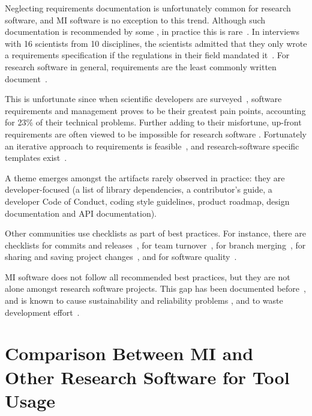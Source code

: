 \documentclass[draft, 12pt, 3p, times]{elsarticle} %
\begin{document}
Neglecting requirements documentation is unfortunately common for research
software, and MI software is no exception to this trend.  Although such
documentation is recommended by some \cite{TobiasEtAl2018, HerouxEtAl2008,
SmithAndKoothoor2016}, in practice this is rare~\cite{HeatonAndCarver2015}.  In
interviews with 16 scientists from 10 disciplines, the scientists admitted that
they only wrote a requirements specification if the regulations in their field
mandated it~\cite{SandersAndKelly2008}.  For research software in general,
requirements are the least commonly written document~\cite{Nguyen-HoanEtAl2010}. 

This is unfortunate since when scientific developers are
surveyed~\cite{WieseEtAl2019}, software requirements and management proves to be
their greatest pain points, accounting for 23\% of their technical problems.
Further adding to their misfortune, up-front requirements are often viewed to be
impossible for research software \cite{CarverEtAl2007, SegalAndMorris2008}.
Fortunately an iterative approach to requirements is feasible~\cite{Smith2016},
and research-software specific templates exist~\cite{SmithEtAl2007}. 

A theme emerges amongst the artifacts rarely observed in practice: they
are developer-focused (a list of library dependencies, a contributor's guide,
a developer Code of Conduct, coding style guidelines, product roadmap, design
documentation and API documentation).

Other communities use checklists as part of best practices. For instance, there
are checklists for commits and releases~\cite{HerouxEtAl2008}, for team
turnover~\cite{HerouxAndBernholdt2018}, for branch merging~\cite{Brown2015}, for
sharing and saving project changes~\cite{WilsonEtAl2016}, and for software
quality~\cite{ThielEtAl2020, SSI2022}.

MI software does not follow all recommended best practices, but they are not
alone amongst research software projects. This gap has been documented
before~\cite{Storer2017,JohansonAndHasselbring2018}, and is known to cause
sustainability and reliability problems \cite{FaulkEtAl2009}, and to waste
development effort~\cite{deSouzaEtAl2019}.

\section{Comparison Between MI and Other Research Software for Tool Usage}
\label{Sec_CompareTools}
\end{document}
